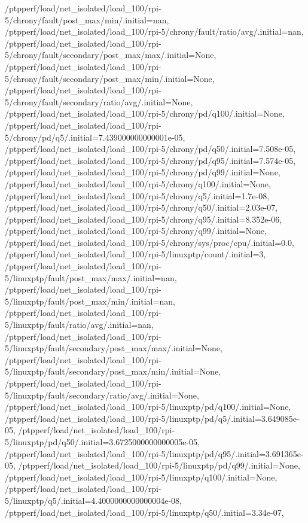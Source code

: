 {    /ptpperf/load/net_isolated/load_100/rpi-5/chrony/fault/post_max/min/.initial=nan,
    /ptpperf/load/net_isolated/load_100/rpi-5/chrony/fault/ratio/avg/.initial=nan,
    /ptpperf/load/net_isolated/load_100/rpi-5/chrony/fault/secondary/post_max/max/.initial=None,
    /ptpperf/load/net_isolated/load_100/rpi-5/chrony/fault/secondary/post_max/min/.initial=None,
    /ptpperf/load/net_isolated/load_100/rpi-5/chrony/fault/secondary/ratio/avg/.initial=None,
    /ptpperf/load/net_isolated/load_100/rpi-5/chrony/pd/q100/.initial=None,
    /ptpperf/load/net_isolated/load_100/rpi-5/chrony/pd/q5/.initial=7.439000000000001e-05,
    /ptpperf/load/net_isolated/load_100/rpi-5/chrony/pd/q50/.initial=7.508e-05,
    /ptpperf/load/net_isolated/load_100/rpi-5/chrony/pd/q95/.initial=7.574e-05,
    /ptpperf/load/net_isolated/load_100/rpi-5/chrony/pd/q99/.initial=None,
    /ptpperf/load/net_isolated/load_100/rpi-5/chrony/q100/.initial=None,
    /ptpperf/load/net_isolated/load_100/rpi-5/chrony/q5/.initial=1.7e-08,
    /ptpperf/load/net_isolated/load_100/rpi-5/chrony/q50/.initial=2.03e-07,
    /ptpperf/load/net_isolated/load_100/rpi-5/chrony/q95/.initial=8.352e-06,
    /ptpperf/load/net_isolated/load_100/rpi-5/chrony/q99/.initial=None,
    /ptpperf/load/net_isolated/load_100/rpi-5/chrony/sys/proc/cpu/.initial=0.0,
    /ptpperf/load/net_isolated/load_100/rpi-5/linuxptp/count/.initial=3,
    /ptpperf/load/net_isolated/load_100/rpi-5/linuxptp/fault/post_max/max/.initial=nan,
    /ptpperf/load/net_isolated/load_100/rpi-5/linuxptp/fault/post_max/min/.initial=nan,
    /ptpperf/load/net_isolated/load_100/rpi-5/linuxptp/fault/ratio/avg/.initial=nan,
    /ptpperf/load/net_isolated/load_100/rpi-5/linuxptp/fault/secondary/post_max/max/.initial=None,
    /ptpperf/load/net_isolated/load_100/rpi-5/linuxptp/fault/secondary/post_max/min/.initial=None,
    /ptpperf/load/net_isolated/load_100/rpi-5/linuxptp/fault/secondary/ratio/avg/.initial=None,
    /ptpperf/load/net_isolated/load_100/rpi-5/linuxptp/pd/q100/.initial=None,
    /ptpperf/load/net_isolated/load_100/rpi-5/linuxptp/pd/q5/.initial=3.649085e-05,
    /ptpperf/load/net_isolated/load_100/rpi-5/linuxptp/pd/q50/.initial=3.6725000000000005e-05,
    /ptpperf/load/net_isolated/load_100/rpi-5/linuxptp/pd/q95/.initial=3.691365e-05,
    /ptpperf/load/net_isolated/load_100/rpi-5/linuxptp/pd/q99/.initial=None,
    /ptpperf/load/net_isolated/load_100/rpi-5/linuxptp/q100/.initial=None,
    /ptpperf/load/net_isolated/load_100/rpi-5/linuxptp/q5/.initial=4.4000000000000004e-08,
    /ptpperf/load/net_isolated/load_100/rpi-5/linuxptp/q50/.initial=3.34e-07,
}
